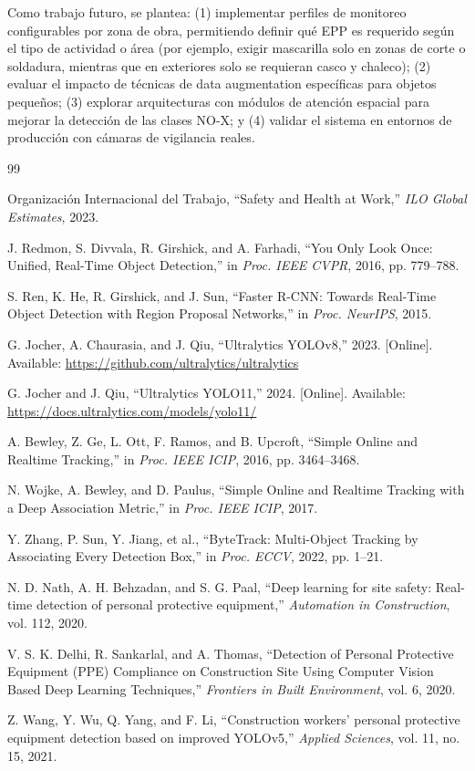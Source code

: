 \documentclass[conference, 10pt]{IEEEtran}
\begin{document}
Como trabajo futuro, se plantea: (1) implementar perfiles de monitoreo configurables por zona de obra, permitiendo definir qué EPP es requerido según el tipo de actividad o área (por ejemplo, exigir mascarilla solo en zonas de corte o soldadura, mientras que en exteriores solo se requieran casco y chaleco); (2) evaluar el impacto de técnicas de data augmentation específicas para objetos pequeños; (3) explorar arquitecturas con módulos de atención espacial para mejorar la detección de las clases NO-X; y (4) validar el sistema en entornos de producción con cámaras de vigilancia reales.

\begin{thebibliography}{99}

Organización Internacional del Trabajo, ``Safety and Health at Work,'' \textit{ILO Global Estimates}, 2023.

J. Redmon, S. Divvala, R. Girshick, and A. Farhadi, ``You Only Look Once: Unified, Real-Time Object Detection,'' in \textit{Proc. IEEE CVPR}, 2016, pp. 779--788.

S. Ren, K. He, R. Girshick, and J. Sun, ``Faster R-CNN: Towards Real-Time Object Detection with Region Proposal Networks,'' in \textit{Proc. NeurIPS}, 2015.

G. Jocher, A. Chaurasia, and J. Qiu, ``Ultralytics YOLOv8,'' 2023. [Online]. Available: \url{https://github.com/ultralytics/ultralytics}

G. Jocher and J. Qiu, ``Ultralytics YOLO11,'' 2024. [Online]. Available: \url{https://docs.ultralytics.com/models/yolo11/}

A. Bewley, Z. Ge, L. Ott, F. Ramos, and B. Upcroft, ``Simple Online and Realtime Tracking,'' in \textit{Proc. IEEE ICIP}, 2016, pp. 3464--3468.

N. Wojke, A. Bewley, and D. Paulus, ``Simple Online and Realtime Tracking with a Deep Association Metric,'' in \textit{Proc. IEEE ICIP}, 2017.

Y. Zhang, P. Sun, Y. Jiang, et al., ``ByteTrack: Multi-Object Tracking by Associating Every Detection Box,'' in \textit{Proc. ECCV}, 2022, pp. 1--21.

N. D. Nath, A. H. Behzadan, and S. G. Paal, ``Deep learning for site safety: Real-time detection of personal protective equipment,'' \textit{Automation in Construction}, vol. 112, 2020.

V. S. K. Delhi, R. Sankarlal, and A. Thomas, ``Detection of Personal Protective Equipment (PPE) Compliance on Construction Site Using Computer Vision Based Deep Learning Techniques,'' \textit{Frontiers in Built Environment}, vol. 6, 2020.

Z. Wang, Y. Wu, Q. Yang, and F. Li, ``Construction workers' personal protective equipment detection based on improved YOLOv5,'' \textit{Applied Sciences}, vol. 11, no. 15, 2021.

\end{thebibliography}
\end{document}

